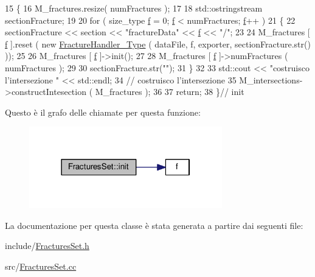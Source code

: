\begin{DoxyCode}
15 \{
16     M\_fractures.resize( numFractures );
17 
18     std::ostringstream sectionFracture;
19 
20     \textcolor{keywordflow}{for} ( size\_type \hyperlink{god__e_8m_a68f477f9b30a6300d5af9b02eac82f35}{f} = 0; \hyperlink{god__e_8m_a68f477f9b30a6300d5af9b02eac82f35}{f} < numFractures; \hyperlink{god__e_8m_a68f477f9b30a6300d5af9b02eac82f35}{f}++ )
21     \{
22         sectionFracture << section << \textcolor{stringliteral}{"fractureData"} << \hyperlink{god__e_8m_a68f477f9b30a6300d5af9b02eac82f35}{f} << \textcolor{stringliteral}{"/"};
23 
24         M\_fractures [ \hyperlink{god__e_8m_a68f477f9b30a6300d5af9b02eac82f35}{f} ].reset ( \textcolor{keyword}{new} \hyperlink{classFractureHandler}{FractureHandler\_Type} ( dataFile, f, exporter, 
      sectionFracture.str() ));
25 
26         M\_fractures [ \hyperlink{god__e_8m_a68f477f9b30a6300d5af9b02eac82f35}{f} ]->init();
27 
28         M\_fractures [ \hyperlink{god__e_8m_a68f477f9b30a6300d5af9b02eac82f35}{f} ]->numFractures ( numFractures );
29 
30         sectionFracture.str(\textcolor{stringliteral}{""});
31     \}
32 
33     std::cout << \textcolor{stringliteral}{"costruisco l'intersezione "} << std::endl;
34     \textcolor{comment}{// costruisco l'intersezione}
35     M\_intersections->constructIntesection ( M\_fractures );
36 
37     \textcolor{keywordflow}{return};
38 \}\textcolor{comment}{// init}
\end{DoxyCode}


Questo è il grafo delle chiamate per questa funzione\-:
\nopagebreak
\begin{figure}[H]
\begin{center}
\leavevmode
\includegraphics[width=238pt]{classFracturesSet_afdaec960c5e2bca4e999e692675895d7_cgraph}
\end{center}
\end{figure}




La documentazione per questa classe è stata generata a partire dai seguenti file\-:\begin{DoxyCompactItemize}
\item 
include/\hyperlink{FracturesSet_8h}{Fractures\-Set.\-h}\item 
src/\hyperlink{FracturesSet_8cc}{Fractures\-Set.\-cc}\end{DoxyCompactItemize}
